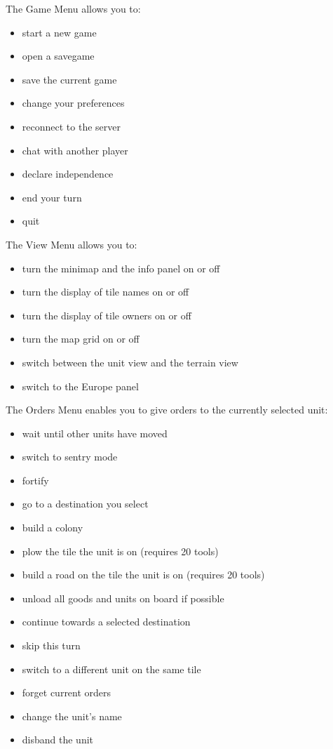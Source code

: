 \documentclass[12pt]{article}
\begin{document}
The \hypertarget{game menu}{Game Menu} allows you to:

\begin{itemize}
\item start a new game 
\item open a savegame
\item save the current game
\item change your preferences
\item reconnect to the server
\item chat with another player
\item declare independence
\item end your turn
\item quit
\end{itemize}

The \hypertarget{view menu}{View Menu} allows you to:

\begin{itemize}
\item turn the minimap and the info panel on or off
\item turn the display of tile names on or off
\item turn the display of tile owners on or off
\item turn the map grid on or off
\item switch between the unit view and the terrain view
\item switch to the Europe panel
\end{itemize}

The \hypertarget{orders menu}{Orders Menu} enables you to give orders
to the currently selected unit:

\begin{itemize}
\item wait until other units have moved
\item switch to sentry mode
\item fortify
\item go to a destination you select
\item build a colony
\item plow the tile the unit is on (requires 20 tools)
\item build a road on the tile the unit is on (requires 20 tools)
\item unload all goods and units on board if possible
\item continue towards a selected destination
\item skip this turn
\item switch to a different unit on the same tile
\item forget current orders
\item change the unit's name
\item disband the unit
\end{itemize}
\end{document}
